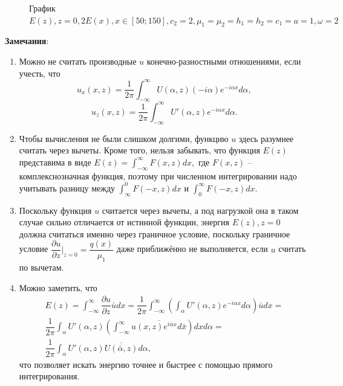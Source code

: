 \documentclass[a4paper, 12pt]{article}
\begin{document}
\begin{figure}[h!]
    \noindent{}
    \caption{График $E(z), z=0, 2E(x), x \in [50;150], c_2=2, \mu_1=\mu_2=h_1=h_2=c_1=a=1, \omega=2$}
    \label{figCurves}
    \end{figure}   
    
    {\bf Замечания}:
    \begin{enumerate}
    \item Можно не считать производные $u$ конечно-разностными отношениями, если учесть, что $$u_x(x,z)=\dfrac{1}{2\pi}\int^{\infty}_{-\infty} U(\alpha,z) (-i \alpha)e^{-i \alpha x}d\alpha,$$ $$ u_z(x,z)=\dfrac{1}{2\pi}\int^{\infty}_{-\infty} U'(\alpha,z) e^{-i \alpha x}d\alpha.$$
    \item Чтобы вычисления не были слишком долгими, функцию $u$ здесь разумнее считать через вычеты. Кроме того, нельзя забывать, что функция $E(z)$ представима в виде $E(z)=\int^{\infty}_{-\infty} F(x,z) dx,$ где $F(x,z)$ -- комплекснозначная функция, поэтому при численном интегрировании надо учитывать разницу между $\int^{0}_{\infty} F(-x,z) dx$ и $\int^{\infty}_0 F(-x,z) dx$.
    \item Поскольку функция $u$ считается через вычеты, а под нагрузкой она в таком случае сильно отличается от истинной функции, энергия $E(z), z=0$ должна считаться именно через граничное условие, поскольку граничное условие $\dfrac{\partial u}{\partial z}|_{z=0}=\dfrac{q(x)}{\mu_1}$ даже приближённо не выполняется, если $u$ считать по вычетам.
    \item Можно заметить, что
    \begin{multline}
        E(z)=\int^{\infty}_{-\infty} \dfrac{\partial u}{\partial z} \bar u dx= \dfrac{1}{2\pi}\int^{\infty}_{-\infty} \left(\int_{\alpha} U'(\alpha,z)e^{-i \alpha x}d\alpha\right) \bar u dx=\\
        \dfrac{1}{2\pi} \int_{\alpha} U'(\alpha,z) \left(\int^{\infty}_{-\infty} \overline{u(x,z)e^{i \bar \alpha x} d \bar x} \right) dx d\alpha=\\
        \dfrac{1}{2\pi} \int_{\alpha} U'(\alpha,z) \overline{U(\bar \alpha,z)} d\alpha,
    \end{multline}
что позволяет искать энергию точнее и быстрее с помощью прямого интегрирования.
    \end{enumerate}
    
\end{document}
